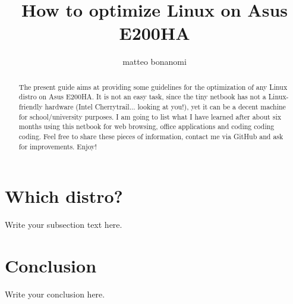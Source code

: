 \documentclass{article}
\begin{document}
\title{How to optimize Linux on Asus E200HA}
\author{matteo bonanomi}

\maketitle

\begin{abstract}
The present guide aims at providing some guidelines for the optimization of any Linux distro on Asus E200HA. It is not an easy task, since the tiny netbook has not a Linux-friendly hardware (Intel Cherrytrail... looking at you!), yet it can be a decent machine for school/university purposes. I am going to list what I have learned after about six months using this netbook for web browsing, office applications and coding coding coding. Feel free to share these pieces of information, contact me via GitHub and ask for improvements. Enjoy!
\end{abstract}

\section{Which distro?}
Write your subsection text here.


\section{Conclusion}
Write your conclusion here.
\end{document}

